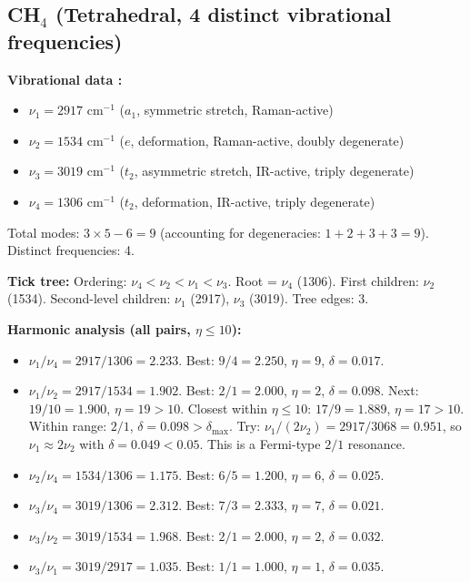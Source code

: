 \documentclass[11pt,twocolumn,a4paper]{article}
\theoremstyle{definition}
\theoremstyle{remark}
\begin{document}
\subsection{CH$_4$ (Tetrahedral, 4 distinct vibrational frequencies)}

\textbf{Vibrational data \citep{shimanouchi1972, nist_webbook}:}
\begin{itemize}[nosep]
\item $\nu_1 = 2917$ cm$^{-1}$ ($a_1$, symmetric stretch, Raman-active)
\item $\nu_2 = 1534$ cm$^{-1}$ ($e$, deformation, Raman-active, doubly degenerate)
\item $\nu_3 = 3019$ cm$^{-1}$ ($t_2$, asymmetric stretch, IR-active, triply degenerate)
\item $\nu_4 = 1306$ cm$^{-1}$ ($t_2$, deformation, IR-active, triply degenerate)
\end{itemize}
Total modes: $3 \times 5 - 6 = 9$ (accounting for degeneracies: $1 + 2 + 3 + 3 = 9$). Distinct frequencies: 4.

\textbf{Tick tree:} Ordering: $\nu_4 < \nu_2 < \nu_1 < \nu_3$. Root = $\nu_4$ (1306). First children: $\nu_2$ (1534). Second-level children: $\nu_1$ (2917), $\nu_3$ (3019). Tree edges: 3.

\textbf{Harmonic analysis (all pairs, $\eta \leq 10$):}

\begin{itemize}[nosep]
\item $\nu_1/\nu_4 = 2917/1306 = 2.233$. Best: $9/4 = 2.250$, $\eta = 9$, $\delta = 0.017$.
\item $\nu_1/\nu_2 = 2917/1534 = 1.902$. Best: $2/1 = 2.000$, $\eta = 2$, $\delta = 0.098$. Next: $19/10 = 1.900$, $\eta = 19 > 10$. Closest within $\eta \leq 10$: $17/9 = 1.889$, $\eta = 17 > 10$. Within range: $2/1$, $\delta = 0.098 > \delta_{\max}$. Try: $\nu_1/(2\nu_2) = 2917/3068 = 0.951$, so $\nu_1 \approx 2\nu_2$ with $\delta = 0.049 < 0.05$. This is a Fermi-type $2/1$ resonance.
\item $\nu_2/\nu_4 = 1534/1306 = 1.175$. Best: $6/5 = 1.200$, $\eta = 6$, $\delta = 0.025$.
\item $\nu_3/\nu_4 = 3019/1306 = 2.312$. Best: $7/3 = 2.333$, $\eta = 7$, $\delta = 0.021$.
\item $\nu_3/\nu_2 = 3019/1534 = 1.968$. Best: $2/1 = 2.000$, $\eta = 2$, $\delta = 0.032$.
\item $\nu_3/\nu_1 = 3019/2917 = 1.035$. Best: $1/1 = 1.000$, $\eta = 1$, $\delta = 0.035$.
\end{itemize}
\end{document}
